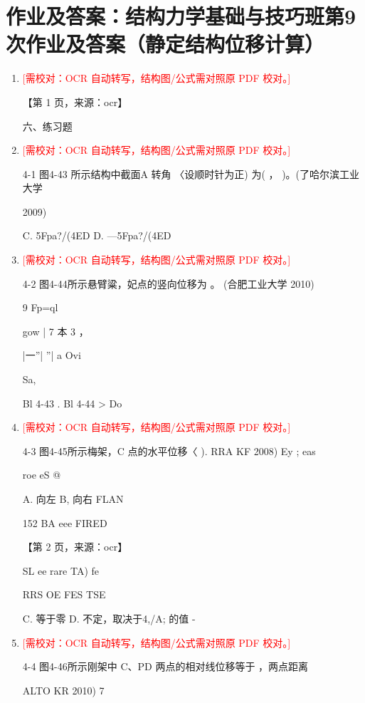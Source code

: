 \documentclass[UTF8,12pt,a4paper,openany]{ctexbook}
\newcommand{\TODO}[1]{\textcolor{red}{[需校对：#1]}}
\begin{document}
\section{作业及答案：结构力学基础与技巧班第9次作业及答案（静定结构位移计算）}
\begin{enumerate}[label=\textbf{\arabic*.},leftmargin=2em]
\item \TODO{OCR 自动转写，结构图/公式需对照原 PDF 校对。}\par 【第 1 页，来源：ocr】\par 六、练习题
\item \TODO{OCR 自动转写，结构图/公式需对照原 PDF 校对。}\par 4-1 图4-43 所示结构中截面A 转角 〈设顺时针为正) 为(  ， )。(了哈尔滨工业大学\par 2009)\par C. 5Fpa?/(4ED                D. —5Fpa?/(4ED
\item \TODO{OCR 自动转写，结构图/公式需对照原 PDF 校对。}\par 4-2 图4-44所示悬臂粱，妃点的竖向位移为      。 (合肥工业大学 2010)\par 9   Fp=ql\par gow |                7     本      3              ，\par |一”| ”|                         a                    Ovi\par Sa,\par Bl 4-43                  .        Bl 4-44           > Do
\item \TODO{OCR 自动转写，结构图/公式需对照原 PDF 校对。}\par 4-3 图4-45所示梅架，C 点的水平位移〈 ). RRA KF 2008)      Ey ;    eas\par roe eS @\par A. 向左                   B, 向右                      FLAN\par 152                                                              BA eee FIRED\par \par 【第 2 页，来源：ocr】\par SL ee rare TA) fe\par RRS OE FES TSE\par C. 等于零    D. 不定，取决于4,/A; 的值 -
\item \TODO{OCR 自动转写，结构图/公式需对照原 PDF 校对。}\par 4-4 图4-46所示刚架中 C、PD 两点的相对线位移等于       ，两点距离\par ALTO KR 2010)           7

\end{enumerate}
\end{document}
